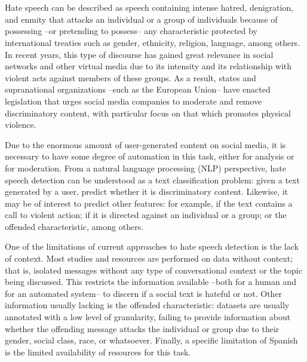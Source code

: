 \chapter*{\runtitle}

\noindent




{
Hate speech can be described as speech containing intense hatred, denigration, and enmity that attacks an individual or a group of individuals because of possessing –or pretending to possess– any characteristic protected by international treaties such as gender, ethnicity, religion, language, among others. In recent years, this type of discourse has gained great relevance in social networks and other virtual media due to its intensity and its relationship with violent acts against members of these groups. As a result, states and supranational organizations –such as the European Union– have enacted legislation that urges social media companies to moderate and remove discriminatory content, with particular focus on that which promotes physical violence.

Due to the enormous amount of user-generated content on social media, it is necessary to have some degree of automation in this task, either for analysis or for moderation. From a natural language processing (NLP) perspective, hate speech detection can be understood as a text classification problem: given a text generated by a user, predict whether it is discriminatory content. Likewise, it may be of interest to predict other features: for example, if the text contains a call to violent action; if it is directed against an individual or a group; or the offended characteristic, among others.

One of the limitations of current approaches to hate speech detection is the lack of context. Most studies and resources are performed on data without context; that is, isolated messages without any type of conversational context or the topic being discussed. This restricts the information available –both for a human and for an automated system– to discern if a social text is hateful or not. Other information usually lacking is the offended characteristic: datasets are usually annotated with a low level of granularity, failing to provide information about whether the offending message attacks the individual or group due to their gender, social class, race, or whatsoever. Finally, a specific limitation of Spanish is the limited availability of resources for this task.

}
